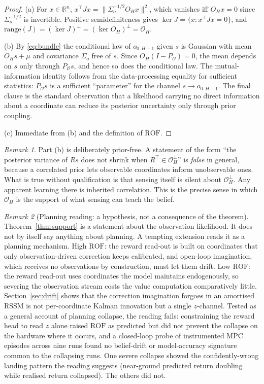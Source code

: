\documentclass[11pt]{article}
\theoremstyle{remark}
\newtheorem{remark}{Remark}
\newcommand{\R}{\mathbb{R}}
\newcommand{\Obs}{\mathcal{O}}
\newcommand{\ROF}{\mathrm{ROF}}
\begin{document}
\begin{proof}
(a) For $x \in \R^n$, $x^\top J x = \lVert \Sigma_o^{-1/2} O_H x \rVert^2$, which vanishes iff $O_H x = 0$ since $\Sigma_o^{-1/2}$ is invertible. Positive semidefiniteness gives $\ker J = \{x : x^\top J x = 0\}$, and $\mathrm{range}(J) = (\ker J)^\perp = (\ker O_H)^\perp = \Obs_H$.

(b) By \eqref{eq:bundle} the conditional law of $o_{0:H-1}$ given $s$ is Gaussian with mean $O_H s + \mu$ and covariance $\Sigma_o$ free of $s$. Since $O_H (I - P_\Obs) = 0$, the mean depends on $s$ only through $P_\Obs s$, and hence so does the conditional law. The mutual-information identity follows from the data-processing equality for sufficient statistics: $P_\Obs s$ is a sufficient ``parameter'' for the channel $s \to o_{0:H-1}$. The final clause is the standard observation that a likelihood carrying no direct information about a coordinate can reduce its posterior uncertainty only through prior coupling.

(c) Immediate from (b) and the definition of $\ROF$.
\end{proof}

\begin{remark}
Part (b) is deliberately prior-free. A statement of the form ``the posterior variance of $R s$ does not shrink when $R^\top \in \Obs_H^\perp$'' is \emph{false} in general, because a correlated prior lets observable coordinates inform unobservable ones. What is true without qualification is that sensing itself is silent about $\Obs_H^\perp$. Any apparent learning there is inherited correlation. This is the precise sense in which $\Obs_H$ is the support of what sensing can teach the belief.
\end{remark}

\begin{remark}[Planning reading: a hypothesis, not a consequence of the theorem]\label{rem:planning}
Theorem~\ref{thm:support} is a statement about the observation likelihood. It does not by itself say anything about planning. A tempting extension reads it as a planning mechanism. High $\ROF$: the reward read-out is built on coordinates that only observation-driven correction keeps calibrated, and open-loop imagination, which receives no observations by construction, must let them drift. Low $\ROF$: the reward read-out uses coordinates the model maintains endogenously, so severing the observation stream costs the value computation comparatively little. Section~\ref{sec:drift} shows that the correction imagination forgoes in an amortised RSSM is not per-coordinate Kalman innovation but a single $z$-channel. Tested as a general account of planning collapse, the reading fails: constraining the reward head to read $z$ alone raised $\ROF$ as predicted but did not prevent the collapse on the hardware where it occurs, and a closed-loop probe of instrumented MPC episodes across nine runs found no belief-drift or model-accuracy signature common to the collapsing runs. One severe collapse showed the confidently-wrong landing pattern the reading suggests (near-ground predicted return doubling while realised return collapsed). The others did not.
\end{remark}
\end{document}
